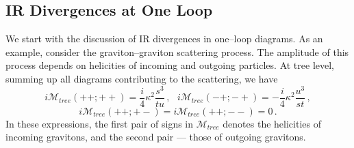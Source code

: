 \documentclass[12pt]{article}
\newcommand{\be}{\begin{equation}}
\newcommand{\ee}{\end{equation}}
\newcommand{\M}{\mathcal{M}}
\begin{document}
\subsection{IR Divergences at One Loop}

We start with the discussion of IR divergences in one--loop diagrams. As an example, consider the graviton--graviton scattering process. The amplitude of this process depends on helicities of incoming and outgoing particles. At tree level, summing up all diagrams contributing to the scattering, we have \cite{Grisaru:1979re}
\be
i\M_{\textit{tree}}(++;++)=\dfrac{i}{4}\kappa^2\dfrac{s^3}{tu}\,,~~~i\M_{\textit{tree}}(-+;-+)=-\dfrac{i}{4}\kappa^2\dfrac{u^3}{st}\,,
\ee
\be
i\M_{\textit{tree}}(++;+-)=i\M_{\textit{tree}}(++;--)=0\,.
\ee
In these expressions, the first pair of signs in $\M_{\textit{tree}}$ denotes the helicities of incoming gravitons, and the second pair --- those of outgoing gravitons.
\end{document}
